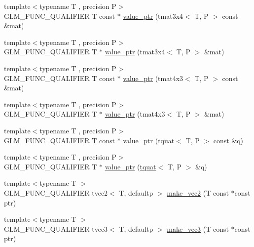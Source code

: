 \begin{DoxyCompactItemize}
\item 
{\footnotesize template$<$typename T , precision P$>$ }\\G\+L\+M\+\_\+\+F\+U\+N\+C\+\_\+\+Q\+U\+A\+L\+I\+F\+I\+E\+R T const $\ast$ \hyperlink{group__gtc__type__ptr_gacbf08ea2313cad8a42652d4455e69709}{value\+\_\+ptr} (tmat3x4$<$ T, P $>$ const \&mat)
\item 
{\footnotesize template$<$typename T , precision P$>$ }\\G\+L\+M\+\_\+\+F\+U\+N\+C\+\_\+\+Q\+U\+A\+L\+I\+F\+I\+E\+R T $\ast$ \hyperlink{group__gtc__type__ptr_gafac7c10d557c3db2f061af0ffe8fc9cf}{value\+\_\+ptr} (tmat3x4$<$ T, P $>$ \&mat)
\item 
{\footnotesize template$<$typename T , precision P$>$ }\\G\+L\+M\+\_\+\+F\+U\+N\+C\+\_\+\+Q\+U\+A\+L\+I\+F\+I\+E\+R T const $\ast$ \hyperlink{group__gtc__type__ptr_ga72b0a496d6c190645accac32f48f64bb}{value\+\_\+ptr} (tmat4x3$<$ T, P $>$ const \&mat)
\item 
{\footnotesize template$<$typename T , precision P$>$ }\\G\+L\+M\+\_\+\+F\+U\+N\+C\+\_\+\+Q\+U\+A\+L\+I\+F\+I\+E\+R T $\ast$ \hyperlink{group__gtc__type__ptr_gab9cba81cd8a7eb0afc9ac2b9f4fe05ca}{value\+\_\+ptr} (tmat4x3$<$ T, P $>$ \&mat)
\item 
{\footnotesize template$<$typename T , precision P$>$ }\\G\+L\+M\+\_\+\+F\+U\+N\+C\+\_\+\+Q\+U\+A\+L\+I\+F\+I\+E\+R T const $\ast$ \hyperlink{group__gtc__type__ptr_ga26a38ff14840b35c57fa937711c5168c}{value\+\_\+ptr} (\hyperlink{structglm_1_1tquat}{tquat}$<$ T, P $>$ const \&q)
\item 
{\footnotesize template$<$typename T , precision P$>$ }\\G\+L\+M\+\_\+\+F\+U\+N\+C\+\_\+\+Q\+U\+A\+L\+I\+F\+I\+E\+R T $\ast$ \hyperlink{group__gtc__type__ptr_ga637414d7a9e8877e66a59f3b3d700898}{value\+\_\+ptr} (\hyperlink{structglm_1_1tquat}{tquat}$<$ T, P $>$ \&q)
\item 
{\footnotesize template$<$typename T $>$ }\\G\+L\+M\+\_\+\+F\+U\+N\+C\+\_\+\+Q\+U\+A\+L\+I\+F\+I\+E\+R tvec2$<$ T, defaultp $>$ \hyperlink{group__gtc__type__ptr_ga5f7393c30970c5949be13ceb525093a6}{make\+\_\+vec2} (T const $\ast$const ptr)
\item 
{\footnotesize template$<$typename T $>$ }\\G\+L\+M\+\_\+\+F\+U\+N\+C\+\_\+\+Q\+U\+A\+L\+I\+F\+I\+E\+R tvec3$<$ T, defaultp $>$ \hyperlink{group__gtc__type__ptr_ga86f4bc63570db86346db2e567fb760f6}{make\+\_\+vec3} (T const $\ast$const ptr)

\end{DoxyCompactItemize}
